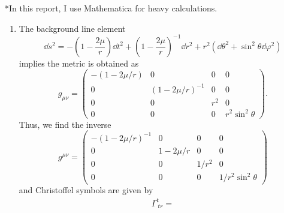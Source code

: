 \documentclass[a4paper,pdftex,10pt]{article}
\begin{document}
\maketitle

*In this report, I use Mathematica for heavy calculations.

\begin{enumerate}
  \item
        The background line element
        \begin{equation}
          \dd s^2
          =
          -
          \left( 1-\frac{2\mu}{r} \right)\dd t^2
          +
          \left( 1-\frac{2\mu}{r} \right)^{-1}\dd r^2
          +
          r^2
          (\dd\theta^2+\sin^2\theta\dd\varphi^2)
        \end{equation}
        implies the metric is obtained as
        \begin{equation}
          g_{\mu\nu}
          =
          \begin{pmatrix}
            -\left( 1-2\mu/r \right) & 0                            & 0   & 0               \\
            0                        & \left( 1-2\mu/r \right)^{-1} & 0   & 0               \\
            0                        & 0                            & r^2 & 0               \\
            0                        & 0                            & 0   & r^2\sin^2\theta
          \end{pmatrix}
          .
        \end{equation}
        Thus, we find the inverse
        \begin{equation}
          g^{\mu\nu}
          =
          \begin{pmatrix}
            -(1-2\mu/r)^{-1} & 0        & 0     & 0                  \\
            0                & 1-2\mu/r & 0     & 0                  \\
            0                & 0        & 1/r^2 & 0                  \\
            0                & 0        & 0     & 1/r^2 \sin^2\theta
          \end{pmatrix}
        \end{equation}
        and Christoffel symbols are given by
        \begin{equation}
          \begin{array}{lll}
            \Gamma^{t}_{\ tr}
            =

\end{array}
\end{equation}
\end{enumerate}
\end{document}
